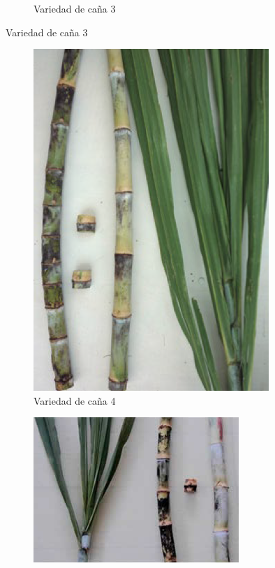 \documentclass{article}%
\begin{document}
\begin{figure}[h!]
\begin{subfigure}{0.33\linewidth}
\caption{Variedad de caña 3}%
\end{subfigure}%
\linebreak%
\newpage%
\end{figure}

%


\begin{figure}[h!]%
\begin{subfigure}{0.33\linewidth}%
\includegraphics[width=0.95\linewidth]{Cana/CP75-11.png}%
\caption{Variedad de caña 4}%
\end{subfigure}%
\begin{subfigure}{0.33\linewidth}%
\includegraphics[width=0.95\linewidth]{Cana/RD75-11.png}%

\end{subfigure}
\end{figure}
\end{document}
